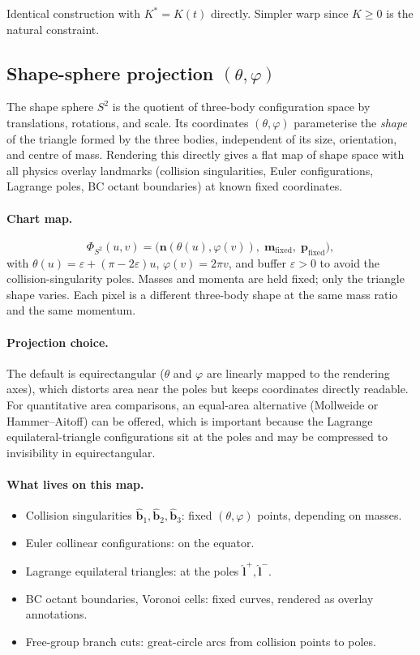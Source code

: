 \documentclass[11pt]{report}
\begin{document}
Identical construction with $K^*=K(t)$ directly. Simpler warp since $K\ge 0$ is the natural constraint.

\subsection{Shape-sphere projection $(\theta,\varphi)$}
\label{sec:shape_sphere_view}

The shape sphere $S^2$ is the quotient of three-body configuration space by translations, rotations, and scale. Its coordinates $(\theta,\varphi)$ parameterise the \emph{shape} of the triangle formed by the three bodies, independent of its size, orientation, and centre of mass. Rendering this directly gives a flat map of shape space with all physics overlay landmarks (collision singularities, Euler configurations, Lagrange poles, BC octant boundaries) at known fixed coordinates.

\paragraph{Chart map.}
\[
\boxed{\Phi_{S^2}(u,v)=\big(\mathbf n(\theta(u),\varphi(v)),\;\mathbf m_{\mathrm{fixed}},\;\mathbf p_{\mathrm{fixed}}\big),}
\]
with $\theta(u)=\varepsilon+(\pi-2\varepsilon)u$, $\varphi(v)=2\pi v$, and buffer $\varepsilon>0$ to avoid the collision-singularity poles. Masses and momenta are held fixed; only the triangle shape varies. Each pixel is a different three-body shape at the same mass ratio and the same momentum.

\paragraph{Projection choice.} The default is equirectangular ($\theta$ and $\varphi$ are linearly mapped to the rendering axes), which distorts area near the poles but keeps coordinates directly readable. For quantitative area comparisons, an equal-area alternative (Mollweide or Hammer--Aitoff) can be offered, which is important because the Lagrange equilateral-triangle configurations sit at the poles and may be compressed to invisibility in equirectangular.

\paragraph{What lives on this map.}
\begin{itemize}[nosep]
\item Collision singularities $\hat{\mathbf b}_1,\hat{\mathbf b}_2,\hat{\mathbf b}_3$: fixed $(\theta,\varphi)$ points, depending on masses.
\item Euler collinear configurations: on the equator.
\item Lagrange equilateral triangles: at the poles $\hat{\mathbf l}^+,\hat{\mathbf l}^-$.
\item BC octant boundaries, Voronoi cells: fixed curves, rendered as overlay annotations.
\item Free-group branch cuts: great-circle arcs from collision points to poles.
\end{itemize}
\end{document}

